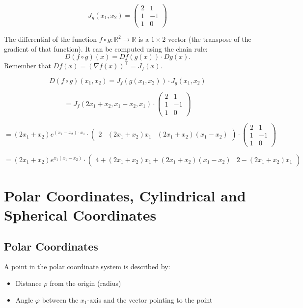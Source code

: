 \documentclass{article}
\begin{document}
\[
J_g(x_1, x_2) =
\begin{pmatrix}
2 & 1 \\
1 & -1 \\
1 & 0
\end{pmatrix}
\]

The differential of the function \( f \circ g : \mathbb{R}^2 \to \mathbb{R} \) is a \( 1 \times 2 \) vector (the transpose of the gradient of that function). It can be computed using the chain rule:
\[
D(f \circ g)(x) = Df(g(x)) \cdot Dg(x).
\]
Remember that \( Df(x) = (\nabla f(x))^\top = J_f(x) \).

\[
D(f \circ g)(x_1, x_2) = J_f(g(x_1, x_2)) \cdot J_g(x_1, x_2)
\]

\[
= J_f(2x_1 + x_2, x_1 - x_2, x_1) \cdot 
\begin{pmatrix}
2 & 1 \\
1 & -1 \\
1 & 0
\end{pmatrix}
\]

\[
= (2x_1 + x_2)e^{(x_1 - x_2) \cdot x_1} \cdot 
\begin{pmatrix}
2 & (2x_1 + x_2)x_1 & (2x_1 + x_2)(x_1 - x_2)
\end{pmatrix}
\cdot 
\begin{pmatrix}
2 & 1 \\
1 & -1 \\
1 & 0
\end{pmatrix}
\]

\[
= (2x_1 + x_2)e^{x_1(x_1 - x_2)} \cdot 
\begin{pmatrix}
4 + (2x_1 + x_2)x_1 + (2x_1 + x_2)(x_1 - x_2) & 2 - (2x_1 + x_2)x_1
\end{pmatrix}
\]

\newpage
\section{Polar Coordinates, Cylindrical and Spherical Coordinates}

\subsection{Polar Coordinates}
A point in the polar coordinate system is described by:
\begin{itemize}
    \item Distance $\rho$ from the origin (radius)
    \item Angle $\varphi$ between the $x_1$-axis and the vector pointing to the point
\end{itemize}
\end{document}
